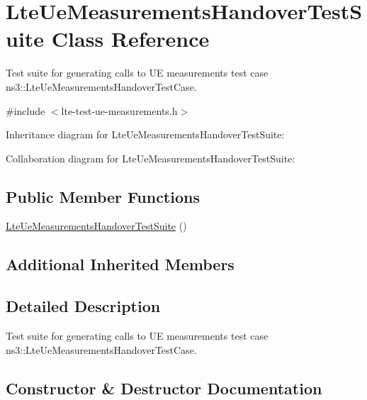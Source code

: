 \hypertarget{classLteUeMeasurementsHandoverTestSuite}{}\section{Lte\+Ue\+Measurements\+Handover\+Test\+Suite Class Reference}
\label{classLteUeMeasurementsHandoverTestSuite}


Test suite for generating calls to UE measurements test case ns3\+::\+Lte\+Ue\+Measurements\+Handover\+Test\+Case.  




{\ttfamily \#include $<$lte-\/test-\/ue-\/measurements.\+h$>$}



Inheritance diagram for Lte\+Ue\+Measurements\+Handover\+Test\+Suite\+:


Collaboration diagram for Lte\+Ue\+Measurements\+Handover\+Test\+Suite\+:
\subsection*{Public Member Functions}
\begin{DoxyCompactItemize}
\item 
\hyperlink{classLteUeMeasurementsHandoverTestSuite_a2a3fb15f62e44e2372f085afb8e32776}{Lte\+Ue\+Measurements\+Handover\+Test\+Suite} ()
\end{DoxyCompactItemize}
\subsection*{Additional Inherited Members}


\subsection{Detailed Description}
Test suite for generating calls to UE measurements test case ns3\+::\+Lte\+Ue\+Measurements\+Handover\+Test\+Case. 

\subsection{Constructor \& Destructor Documentation}
